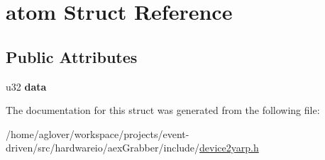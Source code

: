 \hypertarget{structatom}{}\section{atom Struct Reference}
\label{structatom}
\subsection*{Public Attributes}
\begin{DoxyCompactItemize}
\item 
u32 {\bfseries data}\hypertarget{structatom_a54c9c4d5af5fc3f2ca8f14f05917c197}{}\label{structatom_a54c9c4d5af5fc3f2ca8f14f05917c197}

\end{DoxyCompactItemize}


The documentation for this struct was generated from the following file\+:\begin{DoxyCompactItemize}
\item 
/home/aglover/workspace/projects/event-\/driven/src/hardwareio/aex\+Grabber/include/\hyperlink{device2yarp_8h}{device2yarp.\+h}\end{DoxyCompactItemize}
